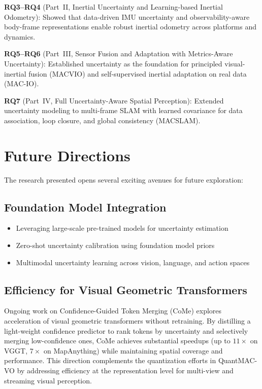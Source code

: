 \textbf{RQ3--RQ4} (Part~II, Inertial Uncertainty and Learning-based Inertial Odometry): Showed that data-driven IMU uncertainty and observability-aware body-frame representations enable robust inertial odometry across platforms and dynamics.

\textbf{RQ5--RQ6} (Part~III, Sensor Fusion and Adaptation with Metrics-Aware Uncertainty): Established uncertainty as the foundation for principled visual-inertial fusion (MACVIO) and self-supervised inertial adaptation on real data (MAC-IO).

\textbf{RQ7} (Part~IV, Full Uncertainty-Aware Spatial Perception): Extended uncertainty modeling to multi-frame SLAM with learned covariance for data association, loop closure, and global consistency (MACSLAM).

\section{Future Directions}

The research presented opens several exciting avenues for future exploration:

\subsection{Foundation Model Integration}
\begin{itemize}
    \item Leveraging large-scale pre-trained models for uncertainty estimation
    \item Zero-shot uncertainty calibration using foundation model priors
    \item Multimodal uncertainty learning across vision, language, and action spaces
\end{itemize}

\subsection{Efficiency for Visual Geometric Transformers}
Ongoing work on Confidence-Guided Token Merging (CoMe) explores acceleration of visual geometric transformers without retraining. By distilling a light-weight confidence predictor to rank tokens by uncertainty and selectively merging low-confidence ones, CoMe achieves substantial speedups (up to $11\times$ on VGGT, $7\times$ on MapAnything) while maintaining spatial coverage and performance. This direction complements the quantization efforts in QuantMAC-VO by addressing efficiency at the representation level for multi-view and streaming visual perception.

